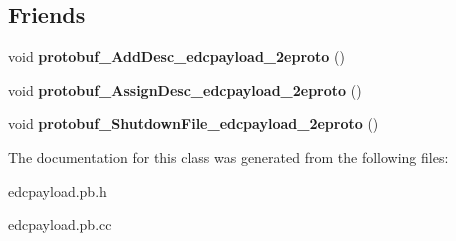 \subsection*{Friends}
\begin{DoxyCompactItemize}
\item 
\hypertarget{classedcdatatypes_1_1_edc_payload___edc_position_ad13cfbf79a53586d1a436cf24430949c}{void {\bfseries protobuf\-\_\-\-Add\-Desc\-\_\-edcpayload\-\_\-2eproto} ()}\label{classedcdatatypes_1_1_edc_payload___edc_position_ad13cfbf79a53586d1a436cf24430949c}

\item 
\hypertarget{classedcdatatypes_1_1_edc_payload___edc_position_ab647c246a2851f27e483b2ddb5dac445}{void {\bfseries protobuf\-\_\-\-Assign\-Desc\-\_\-edcpayload\-\_\-2eproto} ()}\label{classedcdatatypes_1_1_edc_payload___edc_position_ab647c246a2851f27e483b2ddb5dac445}

\item 
\hypertarget{classedcdatatypes_1_1_edc_payload___edc_position_aaa1f6cfe98731937eb4a2c1c2a368990}{void {\bfseries protobuf\-\_\-\-Shutdown\-File\-\_\-edcpayload\-\_\-2eproto} ()}\label{classedcdatatypes_1_1_edc_payload___edc_position_aaa1f6cfe98731937eb4a2c1c2a368990}

\end{DoxyCompactItemize}


The documentation for this class was generated from the following files\-:\begin{DoxyCompactItemize}
\item 
edcpayload.\-pb.\-h\item 
edcpayload.\-pb.\-cc\end{DoxyCompactItemize}
